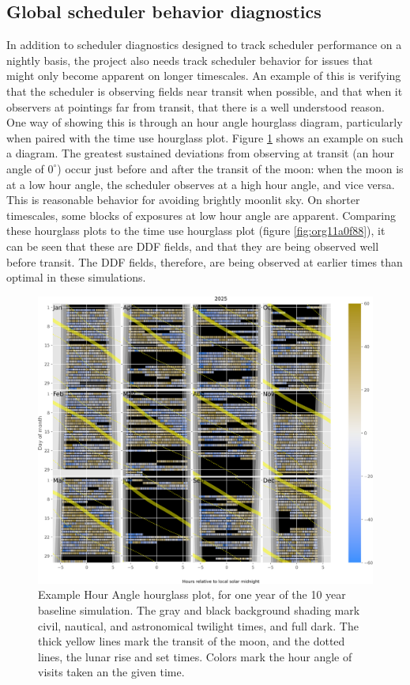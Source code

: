 \subsection{Global scheduler behavior diagnostics}
\label{sec:org47eee4b}
In addition to scheduler diagnostics designed to track scheduler performance on a nightly basis, the project also needs track scheduler behavior for issues that might only become apparent on longer timescales.
An example of this is verifying that the scheduler is observing fields near transit when possible, and that when it observers at pointings far from transit, that there is a well understood reason.
One way of showing this is through an hour angle hourglass diagram, particularly when paired with the time use hourglass plot.
Figure \ref{fig:org4807851} shows an example on such a diagram.
The greatest sustained deviations from observing at transit (an hour angle of \(0^{\circ}\)) occur just before and after the transit of the moon: when the moon is at a low hour angle, the scheduler observes at a high hour angle, and vice versa.
This is reasonable behavior for avoiding brightly moonlit sky.
On shorter timescales, some blocks of exposures at low hour angle are apparent.
Comparing these hourglass plots to the time use hourglass plot (figure \ref{fig:org11a0f88}), it can be seen that these are DDF fields, and that they are being observed well before transit.
The DDF fields, therefore, are being observed at earlier times than optimal in these simulations.

\begin{figure}[htbp]
\centering
\includegraphics[width=1.0\textwidth]{./figures/hour_angle_hourglass.png}
\caption{\label{fig:org4807851}Example Hour Angle hourglass plot, for one year of the 10 year baseline simulation. The gray and black background shading mark civil, nautical, and astronomical twilight times, and full dark. The thick yellow lines mark the transit of the moon, and the dotted lines, the lunar rise and set times. Colors mark the hour angle of visits taken an the given time.}
\end{figure}

